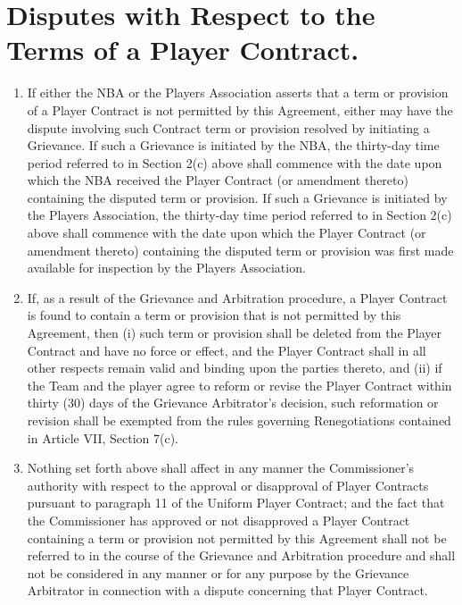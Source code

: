 \documentclass[
]{book}
\providecommand{\tightlist}{%
  \setlength{\itemsep}{0pt}\setlength{\parskip}{0pt}}
\begin{document}
\hypertarget{disputes-with-respect-to-the-terms-of-a-player-contract.}{%
\section{Disputes with Respect to the Terms of a Player Contract.}\label{disputes-with-respect-to-the-terms-of-a-player-contract.}}

\begin{enumerate}
\def\labelenumi{(\alph{enumi})}
\tightlist
\item
  If either the NBA or the Players Association asserts that a term or provision of a Player Contract is not permitted by this Agreement, either may have the dispute involving such Contract term or provision resolved by initiating a Grievance. If such a Grievance is initiated by the NBA, the thirty-day time period referred to in Section 2(c) above shall commence with the date upon which the NBA received the Player Contract (or amendment thereto) containing the disputed term or provision. If such a Grievance is initiated by the Players Association, the thirty-day time period referred to in Section 2(c) above shall commence with the date upon which the Player Contract (or amendment thereto) containing the disputed term or provision was first made available for inspection by the Players Association.
\item
  If, as a result of the Grievance and Arbitration procedure, a Player Contract is found to contain a term or provision that is not permitted by this Agreement, then (i) such term or provision shall be deleted from the Player Contract and have no force or effect, and the Player Contract shall in all other respects remain valid and binding upon the parties thereto, and (ii) if the Team and the player agree to reform or revise the Player Contract within thirty (30) days of the Grievance Arbitrator's decision, such reformation or revision shall be exempted from the rules governing Renegotiations contained in Article VII, Section 7(c).
\item
  Nothing set forth above shall affect in any manner the Commissioner's authority with respect to the approval or disapproval of Player Contracts pursuant to paragraph 11 of the Uniform Player Contract; and the fact that the Commissioner has approved or not disapproved a Player Contract containing a term or provision not permitted by this Agreement shall not be referred to in the course of the Grievance and Arbitration procedure and shall not be considered in any manner or for any purpose by the Grievance Arbitrator in connection with a dispute concerning that Player Contract.
\end{enumerate}
\end{document}
